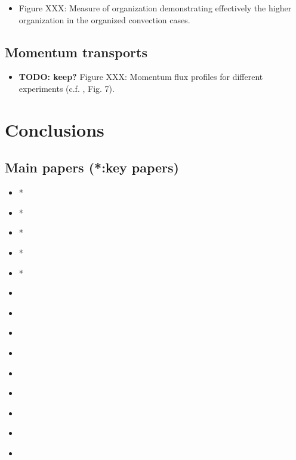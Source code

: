 \documentclass[11pt,a4paper]{article}
\newcommand\todo[1]{\textbf{TODO: #1}}
\begin{document}
\begin{itemize}
    \item Figure XXX: Measure of organization demonstrating effectively the higher organization in the organized convection cases.
\end{itemize}

\subsection{Momentum transports}
\begin{itemize}
    \item \todo{keep?} Figure XXX: Momentum flux profiles for different experiments (c.f. \cite{RE2001}, Fig. 7).
\end{itemize}
\section{Conclusions}

\newpage
\subsection*{Main papers (*:key papers)}
\begin{itemize}
    \item * \cite{CC2006I}
    \item * \cite{CC2006II}
    \item * \cite{RE2001}
    \item * \cite{RKW1988}
    \item * \cite{PC2008}
    \item \cite{birch2014scale}
    \item \cite{cohen2004response}
    \item \cite{gregory1997parametrization}
    \item \cite{houze1977structure}
    \item \cite{kershaw1997parametrization}
    \item \cite{robe1996moist}
    \item \cite{sakradzija2016stochastic}
    \item \cite{sengupta1990cumulus}
    \item \cite{TMM1982}
\end{itemize}


\printbibliography[title={References}]
\end{document}
